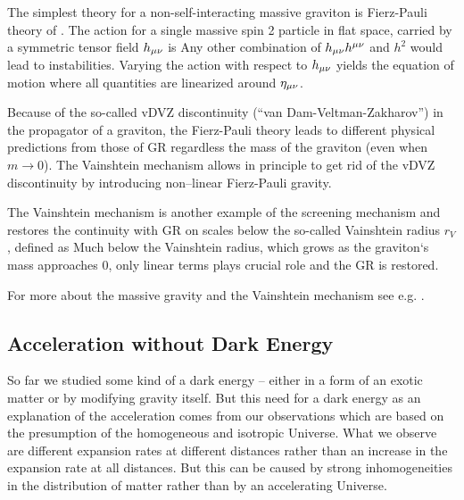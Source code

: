 The simplest theory for a non-self-interacting massive graviton is Fierz-Pauli theory of \textcite{1939RSPSA.173..211F}. The action for a single massive spin 2 particle in flat space, carried by a symmetric tensor field $h_{\mu\nu}$ is
Any other combination of $h_{\mu\nu} h^{\mu\nu}$ and $h^2$ would lead to instabilities. Varying the action with respect to $h_{\mu\nu}$ yields the equation of motion
where all quantities are linearized around $\eta_{\mu\nu}$.

Because of the so-called vDVZ discontinuity (``van Dam-Veltman-Zakharov'') in the propagator of a graviton, the Fierz-Pauli theory leads to different physical predictions from those of GR regardless the mass of the graviton (even when $m\to0$). The Vainshtein mechanism \parencite{1972PhLB...39..393V} allows in principle to get rid of the vDVZ discontinuity by introducing non--linear Fierz-Pauli gravity.

The Vainshtein mechanism is another example of the screening mechanism and restores the continuity with GR on scales below the so-called Vainshtein radius $r_V$, defined as
Much below the Vainshtein radius, which grows as the graviton`s mass approaches $0$, only linear terms plays crucial role and the GR is restored.

For more about the massive gravity and the Vainshtein mechanism see e.g. \textcite{2013CQGra..30r4001B,2012RvMP...84..671H}.

\subsection{Acceleration without Dark Energy}
So far we studied some kind of a dark energy -- either in a form of an exotic matter or by modifying gravity itself. But this need for a dark energy as an explanation of the acceleration comes from our observations which are based on the presumption of the homogeneous and isotropic Universe. What we observe are different expansion rates at different distances rather than an increase in the expansion rate at all distances. But this can be caused by strong inhomogeneities in the distribution of matter rather than by an accelerating Universe.
